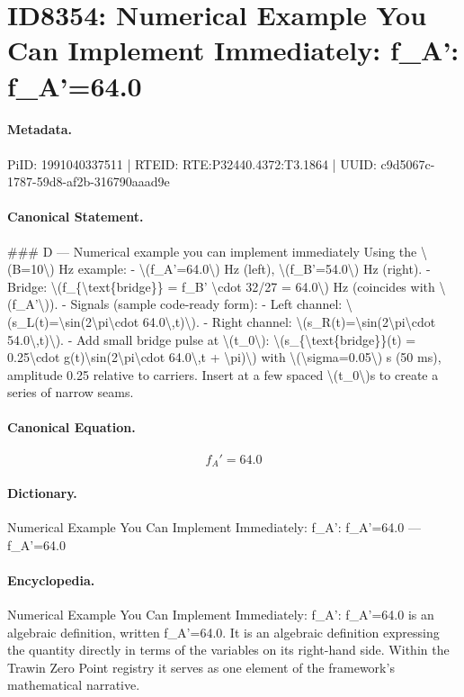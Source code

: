 \section*{ID8354: Numerical Example You Can Implement Immediately: f\_A': f\_A'=64.0}
\paragraph{Metadata.}
PiID: 1991040337511 | RTEID: RTE:P32440.4372:T3.1864 | UUID: c9d5067c-1787-59d8-af2b-316790aaad9e

\paragraph{Canonical Statement.}
\#\#\# D — Numerical example you can implement immediately Using the \textbackslash{}(B=10\textbackslash{}) Hz example: - \textbackslash{}(f\_A'=64.0\textbackslash{}) Hz (left), \textbackslash{}(f\_B'=54.0\textbackslash{}) Hz (right). - Bridge: \textbackslash{}(f\_\{\textbackslash{}text\{bridge\}\} = f\_B' \textbackslash{}cdot 32/27 = 64.0\textbackslash{}) Hz (coincides with \textbackslash{}(f\_A'\textbackslash{})). - Signals (sample code-ready form): - Left channel: \textbackslash{}(s\_L(t)=\textbackslash{}sin(2\textbackslash{}pi\textbackslash{}cdot 64.0\textbackslash{},t)\textbackslash{}). - Right channel: \textbackslash{}(s\_R(t)=\textbackslash{}sin(2\textbackslash{}pi\textbackslash{}cdot 54.0\textbackslash{},t)\textbackslash{}). - Add small bridge pulse at \textbackslash{}(t\_0\textbackslash{}): \textbackslash{}(s\_\{\textbackslash{}text\{bridge\}\}(t) = 0.25\textbackslash{}cdot g(t)\textbackslash{}sin(2\textbackslash{}pi\textbackslash{}cdot 64.0\textbackslash{},t + \textbackslash{}pi)\textbackslash{}) with \textbackslash{}(\textbackslash{}sigma=0.05\textbackslash{}) s (50 ms), amplitude 0.25 relative to carriers. Insert at a few spaced \textbackslash{}(t\_0\textbackslash{})s to create a series of narrow seams.

\paragraph{Canonical Equation.}
\[
f_A'=64.0
\]

\paragraph{Dictionary.}
Numerical Example You Can Implement Immediately: f\_A': f\_A'=64.0 — f\_A'=64.0

\paragraph{Encyclopedia.}
Numerical Example You Can Implement Immediately: f\_A': f\_A'=64.0 is an algebraic definition, written f\_A'=64.0. It is an algebraic definition expressing the quantity directly in terms of the variables on its right-hand side. Within the Trawin Zero Point registry it serves as one element of the framework's mathematical narrative.
